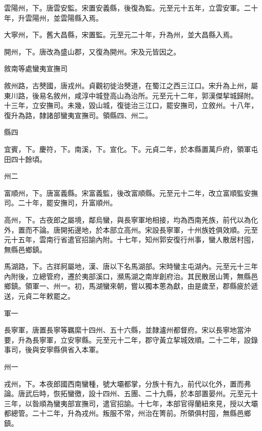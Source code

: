 \begin{pinyinscope}
 雲陽州，下。唐雲安監。宋置安義縣，後復為監。元至元十五年，立雲安軍。二十年，升雲陽州，並雲陽縣入焉。



 大寧州，下。舊大昌縣，宋置監。元至元二十年，升為州，並大昌縣入焉。



 開州，下。唐改為盛山郡，又復為開州。宋及元皆因之。



 敘南等處蠻夷宣撫司



 敘州路，古僰國，唐戎州。貞觀初徙治僰道，在蜀江之西三江口。宋升為上州，屬東川路，後易名敘州，咸淳中城登高山為治所。元至元十二年，郭漢傑挈城歸附。十三年，立安撫司。未幾，毀山城，復徙治三江口，罷安撫司，立敘州。十八年，復升為路，隸諸部蠻夷宣撫司。領縣四、州二。



 縣四



 宜賓，下。慶符，下。南溪，下。宣化。下。元貞二年，於本縣置萬戶府，領軍屯田四十餘頃。



 州二



 富順州，下。唐富義縣。宋富義監，後改富順縣。元至元十二年，改立富順監安撫司。二十年，罷安撫司，升富順州。



 高州，下。古夜郎之屬境，鄰烏蠻，與長寧軍地相接，均為西南羌族，前代以為化外，置而不論。唐開拓邊地，於本部立高州。宋設長寧軍，十州族姓俱效順。元至元十五年，雲南行省遣官招諭內附。十七年，知州郭安復行州事，蠻人散居村囤，無縣邑鄉鎮。



 馬湖路，下。古牂牁屬地，漢、唐以下名馬湖部。宋時蠻主屯湖內。元至元十三年內附後，立總管府，遷於夷部溪口，瀕馬湖之南岸創府治。其民散居山箐，無縣邑鄉鎮。領軍一、州一。初，馬湖蠻來朝，嘗以獨本蔥為獻，由是歲至，郡縣疲於遞送，元貞二年敕罷之。



 軍一



 長寧軍，唐置長寧等羈縻十四州、五十六縣，並隸瀘州都督府。宋以長寧地當沖要，升為長寧軍，立安寧縣。元至元十二年，郡守黃立挈城效順。二十二年，設錄事司，後與安寧縣俱省入本軍。



 州一



 戎州，下。本夜郎國西南蠻種，號大壩都掌，分族十有九，前代以化外，置而弗論。唐武后時，恢拓蠻徼，設十四州、五團、二十九縣，於本部置晏州。元至元十三年，以昝順為蠻夷部宣撫司，遣官招諭。十七年，本部官得蘭紐來見，授以大壩都總管。二十二年，升為戎州。叛服不常，州治在箐前。所領俱村囤，無縣邑鄉鎮。




\end{pinyinscope}
